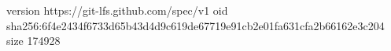 version https://git-lfs.github.com/spec/v1
oid sha256:6f4e2434f6733d65b43d4d9c619de67719e91cb2e01fa631cfa2b66162e3c204
size 174928
